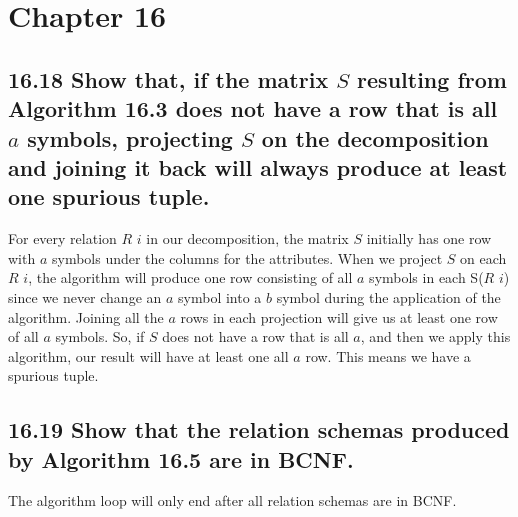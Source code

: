\section*{Chapter 16}


\subsection*{16.18 Show that, if the matrix $S$ resulting from Algorithm 16.3 does not have a row that is all $a$ symbols, projecting $S$ on the decomposition and joining it back will always produce at least one spurious tuple.}

For every relation $R$ $i$ in our decomposition, the matrix $S$ initially has one row with $a$ symbols under the columns for the attributes. 
When we project $S$ on each $R$ $i$, the algorithm will produce one row consisting of all $a$ symbols in each S($R$ $i$) since we never change an $a$ symbol into a $b$ symbol during the application of the algorithm. Joining all the $a$ rows in each projection will give us at least one row of all $a$ symbols. So, if $S$ does not have a row that is all $a$, and then we apply this algorithm, our result will have at least one all $a$ row.
This means we have a spurious tuple.

\subsection*{16.19 Show that the relation schemas produced by Algorithm 16.5 are in BCNF.}
The algorithm loop will only end after all relation schemas are in BCNF.